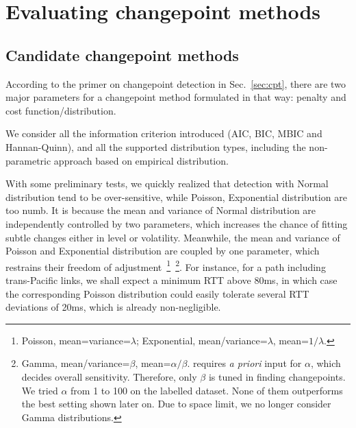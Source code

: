 \section{Evaluating changepoint methods}
\subsection{Candidate changepoint methods}
\label{sec:method}
According to the primer on changepoint detection in Sec.~\ref{sec:cpt}, there are two major parameters for a changepoint method formulated in that way: penalty and cost function/distribution.

We consider all the information criterion introduced (AIC, BIC, MBIC and Hannan-Quinn), and all the supported distribution types, including the non-parametric approach based on empirical distribution.

With some preliminary tests, we quickly realized that detection with Normal distribution tend to be over-sensitive, while Poisson, Exponential distribution are too numb.
It is because the mean and variance of Normal distribution are independently controlled by two parameters, which increases the chance of fitting subtle changes either in level or volatility.
Meanwhile, the mean and variance of Poisson and Exponential distribution are coupled by one parameter,
which restrains their freedom of adjustment~\footnote{Poisson, mean=variance=$\lambda$; Exponential, mean/variance=$\lambda$, mean=$1/\lambda$.}~\footnote{Gamma, mean/variance=$\beta$, mean=$\alpha/\beta$. \cite{Killick2013a} requires \textit{a priori} input for $\alpha$, which decides overall sensitivity. Therefore, only $\beta$ is tuned in finding changepoints.
We tried $\alpha$ from 1 to 100 on the labelled dataset. None of them outperforms the best setting shown later on. Due to space limit, we no longer consider Gamma distributions.}.
For instance, for a path including trans-Pacific links, we shall expect a minimum RTT above 80ms, in which case the corresponding Poisson distribution could easily tolerate several RTT deviations of 20ms, which is already non-negligible.



